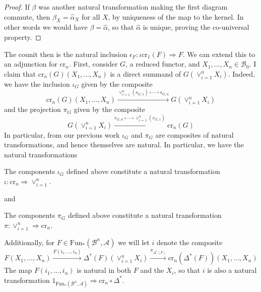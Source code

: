 \begin{proof}
    If $\beta$ was another natural transformation making the first diagram commute, then $\beta_X = \hat{\alpha}_X$ for all $X$, by uniqueness of the map to the kernel. In other words we would have $\beta = \hat{\alpha}$, so that $\hat{\alpha}$ is unique, proving the co-universal property.
\end{proof}


The counit then is the natural inclusion $\epsilon_F:\iota\text{cr}_1(F)\Rightarrow F$.  We can extend this to an adjunction for $\text{cr}_n$. First, consider $G$, a reduced functor, and $X_1,...,X_n \in \mathcal{B}_0$. I claim that $\text{cr}_n(G)(X_1,...,X_n)$ is a direct summand of $G(\lor_{i=1}^nX_i)$. Indeed, we have the inclusion $\iota_G$ given by the composite
\begin{equation*}
    \text{cr}_n(G)(X_1,...,X_n)\xrightarrow{\lor_{i=1}^n(s_{G,1})\circ \cdots \circ s_{G,n}}G(\lor_{i=1}^nX_i)
\end{equation*}
and the projection $\pi_G$ given by the composite
\begin{equation*}
    G(\lor_{i=1}^nX_i)\xrightarrow{r_{G,n}\circ \cdots \circ \lor_{i=1}^n(r_{G,1})}\text{cr}_n(G)
\end{equation*}
In particular, from our previous work $\iota_G$ and $\pi_G$ are composites of natural transformations, and hence themselves are natural. In particular, we have the natural transformations
\begin{lem}[label=lem:lorInj]
    The components $\iota_G$ defined above constitute a natural transformation $\iota:\text{cr}_n\Rightarrow \lor_{i=1}^n$.
\end{lem}
\noindent and 
\begin{lem}[label=lem:lorProj]
    The components $\pi_G$ defined above constitute a natural transformation $\pi:\lor_{i=1}^n\Rightarrow \text{cr}_n$.
\end{lem}
Additionally, for $F \in {\text{Fun}_*(\mathcal{B}^n,\mathcal{A})}$ we will let $i$ denote the composite 
\begin{equation*}
    F(X_1,...,X_n)\xrightarrow{F(i_1,...,i_n)}\Delta^*(F)(\lor_{i=1}^nX_i)\xrightarrow{\pi_{\Delta^*(F)}}\text{cr}_n(\Delta^*(F))(X_1,...,X_n)
\end{equation*}
The map $F(i_1,...,i_n)$ is natural in both $F$ and the $X_i$, so that $i$ is also a natural transformation $1_{\text{Fun}_*(\mathcal{B}^n,\mathcal{A})}\Rightarrow \text{cr}_n\circ \Delta^*$.
